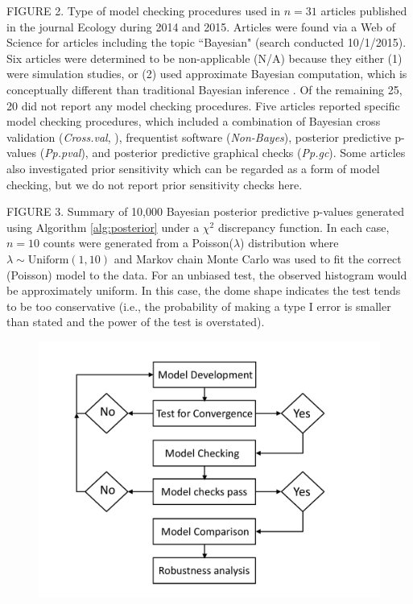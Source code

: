 \documentclass[12pt,english]{article}
\begin{document}
\begin{spacing}{1.9}
FIGURE 2.  Type of model checking procedures used in $n=31$ articles published in the journal Ecology during 2014 and 2015. Articles were found via a Web of Science for articles including the topic ``Bayesian" (search conducted 10/1/2015).  Six articles were determined to be non-applicable (N/A) because they either (1) were simulation studies, or (2) used approximate Bayesian computation, which is conceptually different than traditional Bayesian inference \citep[see e.g.][]{BeaumontEtAl2002}.  Of the remaining 25, 20 did not report any model checking procedures.  Five articles reported specific model checking procedures, which included a combination of Bayesian cross validation (\textit{Cross.val}, ), frequentist software (\textit{Non-Bayes}), posterior predictive p-values (\textit{Pp.pval}), and posterior predictive graphical checks (\textit{Pp.gc}).  Some articles also investigated prior sensitivity which can be regarded as a form of model checking, but we do not report prior sensitivity checks here.

FIGURE 3.  Summary of 10,000 Bayesian posterior predictive p-values generated using Algorithm \ref{alg:posterior} under a $\chi^2$ discrepancy function.  In each case, $n=10$ counts were generated from a Poisson($\lambda$) distribution where $\lambda \sim \textrm{Uniform}(1,10)$ and Markov chain Monte Carlo was used to fit the correct (Poisson) model to the data.  For an unbiased test, the observed histogram would be approximately uniform.  In this case, the dome shape indicates the test tends to be too conservative (i.e., the probability of making a type I error is smaller than stated and the power of the test is overstated).

\pagebreak

\begin{figure}
\begin{center}
\includegraphics[width=170mm]{Bayesian_modeling_decision_diagram.pdf}
\caption{} \label{fig:decision}
\end{center}
\end{figure}


\end{spacing}
\end{document}
